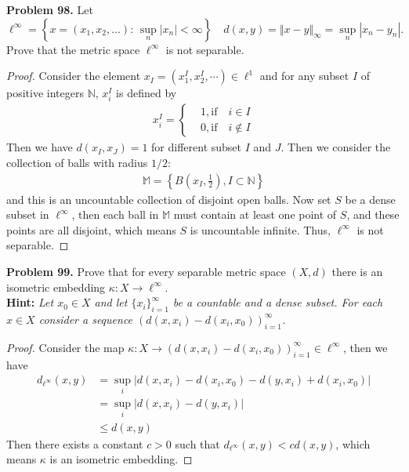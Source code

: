 \documentclass[12pt,leqno]{amsart}
\theoremstyle{definition}
\numberwithin{equation}{subsection}
\begin{document}
\noindent
{\bf Problem 98.}
Let
$$
\ell^\infty=\left\{x=(x_1,x_2,\ldots):\, \sup_{n}|x_n|<\infty\right\}
\quad
d(x,y)=\Vert x-y\Vert_\infty=\sup_{n} |x_n-y_n|.
$$
Prove that the metric space $\ell^\infty$ is not separable.
\begin{proof}
Consider the element $x_I = (x^I_1, x^I_2,\cdots)\in\ell^1$ and for any subset $I$ of positive integers $\mathbb{N}$, $x^I_i$ is defined by
\begin{align*}
    x^I_i = \left\{
    \begin{aligned}
    & 1, \text{if} \quad i \in I\\
    & 0, \text{if} \quad i \notin I
    \end{aligned}
    \right.
\end{align*}
Then we have $d(x_I, x_J) = 1$ for different subset $I$ and $J$. Then we consider the collection of balls with radius $1/2$:
\begin{align*}
    \mathbb{M} = \left\{B\left(x_I, \frac{1}{2}\right), I\subset\mathbb{N}\right\}
\end{align*}
and this is an uncountable collection of disjoint open balls. Now set $S$ be a dense  subset in  $\ell^\infty$, then each ball in $\mathbb{M}$ must contain at least one point of $S$, and these points are all disjoint, which means $S$ is uncountable infinite. Thus, $\ell^\infty$ is not separable.
\end{proof}

\medskip

\noindent
{\bf Problem 99.}
Prove that for every separable metric space $(X,d)$ there is an isometric embedding
$\kappa:X\to\ell^\infty$.\\
{\bf Hint:}
{\em Let $x_0\in X$ and let $\{ x_i\}_{i=1}^\infty$ be a countable and a dense subset. For each $x\in X$
consider a sequence $(d(x,x_i)-d(x_i,x_0))_{i=1}^\infty$.}
\begin{proof}
Consider the map $\kappa: X\to (d(x,x_i)-d(x_i,x_0))_{i=1}^\infty \in \ell^\infty$, then we have 
\begin{align*}
    d_{\ell^\infty}(x,y) & = \sup_i \left|d(x,x_i) - d(x_i,x_0) - d(y,x_i) + d(x_i,x_0)\right| \\
    & = \sup_i \left|d(x,x_i) - d(y,x_i)\right| \\
    & \leq d(x,y)
\end{align*}
Then there exists a constant $c > 0$ such that $d_{\ell^\infty}(x,y) < cd(x,y)$, which means $\kappa$ is an isometric embedding.
\end{proof}
\end{document}
